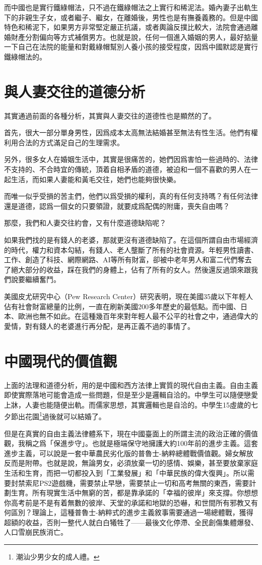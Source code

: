 而中國也是實行鐵綠帽法，只不過在鐵綠帽法之上實行和稀泥法。婚內妻子出軌生下的非親生子女，或者繼子、繼女，在離婚後，男性也是有撫養義務的。但是中國特色和稀泥下，如果男方非常堅定嚴正抗議，或者輿論反撲比較大，法院會通過離婚財產分割偏向等方式補償男方。也就是說，任何一個進入婚姻的男人，最好掂量一下自己在法院的能量和對戴綠帽幫別人養小孩的接受程度，因爲中國默認是實行鐵綠帽法的。

\section{與人妻交往的道德分析}

其實通過前面的各種分析，其實與人妻交往的道德性也是顯然的了。

首先，很大一部分單身男性，因爲成本太高無法結婚甚至無法有性生活。他們有權利用合法的方式滿足自己的生理需求。

另外，很多女人在婚姻生活中，其實是很痛苦的，她們因爲害怕一些過時的、法律不支持的、不合時宜的傳統，頂着自相矛盾的道德，被迫和一個不喜歡的男人在一起生活，而如果人妻能和黃毛交往，她們也能夠很快樂。

而唯一似乎受損的苦主們，他們以爲受損的權利，真的有任何支持嗎？有任何法律還是道德，認爲一個女的只要領證，就要成爲配偶的附庸，喪失自由嗎？

那麼，我們和人妻交往約會，又有什麼道德缺陷呢？

如果我們找的是有錢人的老婆，那就更沒有道德缺陷了。在這個所謂自由市場經濟的時代，權力和資本勾結，有錢人、老人壟斷了所有的社會資源。年輕男性讀書、工作、創造了科技、網際網路、AI等所有財富，卻被中老年男人和富二代們奪去了絕大部分的收益，踩在我們的身體上，佔有了所有的女人。然後還反過頭來跟我們說要繼續奮鬥。

美國皮尤研究中心（Pew Research Center）研究表明，現在美國35歲以下年輕人佔有社會財富總量的比例，一直在刷新美國200多年歷史的最低點。而中國、日本、歐洲也無不如此。在這種幾百年來對年輕人最不公平的社會之中，通過偉大的愛情，對有錢人的老婆進行再分配，是再正義不過的事情了。

\section{中國現代的價值觀}

上面的法理和道德分析，用的是中國和西方法律上實質的現代自由主義。自由主義即使實際落地可能會造成一些問題，但是至少是邏輯自洽的。中學生可以隨便戀愛上牀，人妻也能隨便出軌。而儒家思想，其實邏輯也是自洽的。中學生15虛歲的七夕節出花園\footnote{潮汕少男少女的成人禮。}過後就可以結婚了。

但是在真實的自由主義法律體系下，現在中國臺面上的所謂主流的政治正確的價值觀，我稱之爲「保進步守」。也就是極端保守地擁護大約100年前的進步主義。這套進步主義，可以說是一套中華農民劣化版的普魯士-納粹總體戰價值觀。婦女解放反而是附帶。也就是說，無論男女，必須放棄一切的感情、娛樂，甚至要放棄家庭生活和生育，而把一切都投入到「工業發展」和「中華民族的偉大復興」。所以需要封禁索尼PS2遊戲機，需要禁止早戀，需要禁止一切和高考無關的東西，需要計劃生育。所有現實生活中無窮的苦，都是靠承諾的「幸福的彼岸」來支撐。你想想你高考前是不是有着無數的彼岸、天堂的承諾和地獄的恐嚇，和世間所有邪教又有何區別？理論上，這種普魯士-納粹式的進步主義敘事需要通過一場總體戰，獲得超額的收益，否則一整代人就白白犧牲了——最後文化停滯、全民創傷集體爆發、人口雪崩民族消亡。

